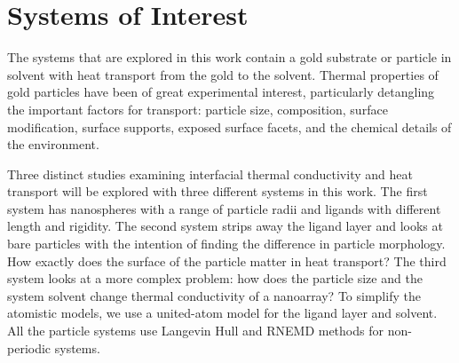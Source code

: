 \section{Systems of Interest}
The systems that are explored in this work contain a gold substrate or particle in solvent with heat transport from the gold to the solvent. 
Thermal properties of gold particles have been of great experimental interest, particularly detangling the important factors for transport: particle size,\cite{Zanjani2014,Liu2015,Wilhelmsen2015,Stocker2016,Tascini2016} composition,\cite{Wilson:2002uq, Ong:2013rt} surface modification,\cite{kuang:AuThl,Ong:2013rt,Ong:2014yq,Liu2015,Stocker2016,Hannah2015,Park2016,Leitner2017} surface supports,\cite{Park2012} exposed surface facets,\cite{Hannah2015} and the chemical details of the environment.\cite{Ge2006,Park2012,Ong:2013rt,Ong:2014yq,Wilhelmsen2015,Park2016} 

Three distinct studies examining interfacial thermal conductivity and heat transport will be explored with three different systems in this work.
The first system has nanospheres with a range of particle radii and ligands with different length and rigidity.\cite{Stocker2016}
The second system strips away the ligand layer and looks at bare particles with the intention of finding the difference in particle morphology.\cite{Neidhart}
How exactly does the surface of the particle matter in heat transport?
The third system looks at a more complex problem: how does the particle size and the system solvent change thermal conductivity of a nanoarray?
To simplify the atomistic models, we use a united-atom model for the ligand layer and solvent.
All the particle systems use Langevin Hull\cite{Vardeman2011} and RNEMD methods for non-periodic systems.\cite{Stocker:2014qq}

